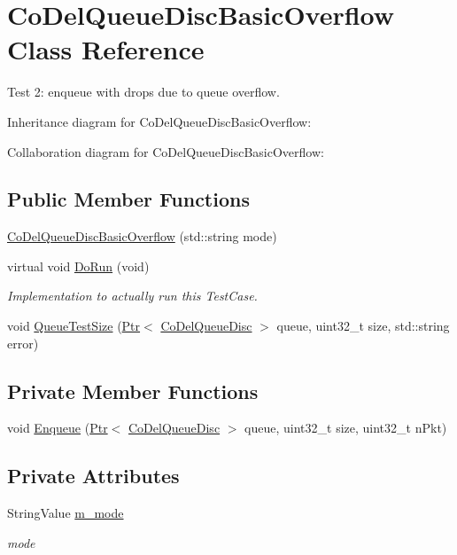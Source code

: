 \hypertarget{classCoDelQueueDiscBasicOverflow}{}\section{Co\+Del\+Queue\+Disc\+Basic\+Overflow Class Reference}
\label{classCoDelQueueDiscBasicOverflow}


Test 2\+: enqueue with drops due to queue overflow.  




Inheritance diagram for Co\+Del\+Queue\+Disc\+Basic\+Overflow\+:


Collaboration diagram for Co\+Del\+Queue\+Disc\+Basic\+Overflow\+:
\subsection*{Public Member Functions}
\begin{DoxyCompactItemize}
\item 
\hyperlink{classCoDelQueueDiscBasicOverflow_a426f13121ac484732af154567c4197d4}{Co\+Del\+Queue\+Disc\+Basic\+Overflow} (std\+::string mode)
\item 
virtual void \hyperlink{classCoDelQueueDiscBasicOverflow_a902879310f02ffebbdf420e3de3daaad}{Do\+Run} (void)
\begin{DoxyCompactList}\small\item\em Implementation to actually run this Test\+Case. \end{DoxyCompactList}\item 
void \hyperlink{classCoDelQueueDiscBasicOverflow_aeb7cd13596fa7241fba47a6dff735fc0}{Queue\+Test\+Size} (\hyperlink{classns3_1_1Ptr}{Ptr}$<$ \hyperlink{classns3_1_1CoDelQueueDisc}{Co\+Del\+Queue\+Disc} $>$ queue, uint32\+\_\+t size, std\+::string error)
\end{DoxyCompactItemize}
\subsection*{Private Member Functions}
\begin{DoxyCompactItemize}
\item 
void \hyperlink{classCoDelQueueDiscBasicOverflow_aafa1c6aac502787881de33c06bd97436}{Enqueue} (\hyperlink{classns3_1_1Ptr}{Ptr}$<$ \hyperlink{classns3_1_1CoDelQueueDisc}{Co\+Del\+Queue\+Disc} $>$ queue, uint32\+\_\+t size, uint32\+\_\+t n\+Pkt)
\end{DoxyCompactItemize}
\subsection*{Private Attributes}
\begin{DoxyCompactItemize}
\item 
String\+Value \hyperlink{classCoDelQueueDiscBasicOverflow_a8300058029d180f082de23dbde5b1ba0}{m\+\_\+mode}
\begin{DoxyCompactList}\small\item\em mode \end{DoxyCompactList}\end{DoxyCompactItemize}
